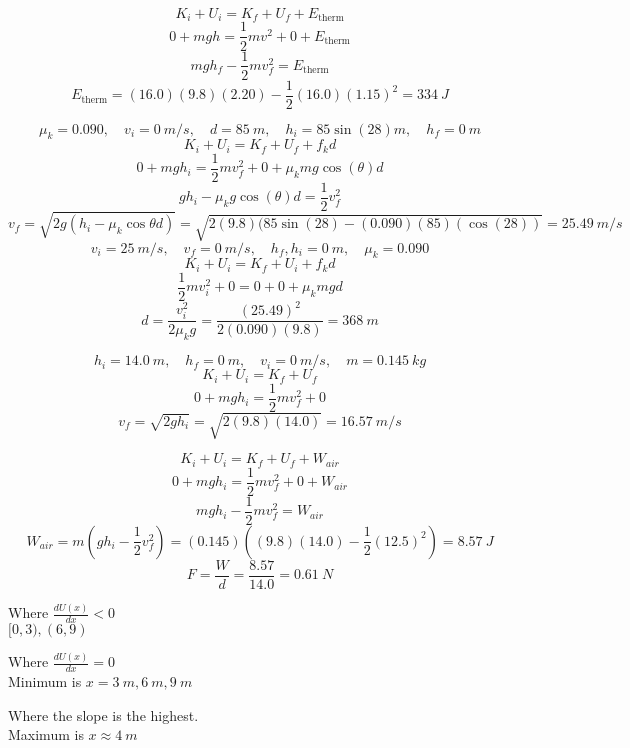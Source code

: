 \documentclass[11pt]{homework}
\begin{document}
\setcounter{questionCounter}{27}
\question
\[
K_i + U_i = K_f + U_f + E_{\text{therm}}
\]
\[
    0 +mgh = \frac{1}{2}mv^2 + 0 + E_{\text{therm}}
\]
\[
    mgh_f - \frac{1}{2}mv_f^2 = E_{\text{therm}}
\]
\[
    E_{\text{therm}}=(16.0)(9.8)(2.20)-\frac{1}{2}(16.0)(1.15)^2 = \boxed{\qty{334}{J}}
\]

\question
\begin{alphaparts}
\questionpart
\[
    \mu_k = 0.090, \quad v_i = \qty{0}{m/s}, \quad d = \qty{85}{m}, \quad h_i = 85\sin(28) \unit{m}, \quad h_f = \qty{0}{m}
\]
\[
K_i + U_i = K_f + U_f + f_kd 
\]
\[
    0 + mgh_i = \frac{1}{2}mv_f^2 + 0 + \mu_kmg\cos(\theta) d 
\]
\[
    gh_i - \mu_kg\cos(\theta)d = \frac{1}{2}v_f^2
\]
\[
    v_f=\sqrt{2g(h_i-\mu_k\cos\theta d)}=\sqrt{2(9.8)(85\sin(28)-(0.090)(85)(\cos(28))} = \boxed{\qty{25.49}{m/s}}
\]
\questionpart
\[
    v_i = \qty{25}{m/s}, \quad v_f = \qty{0}{m/s}, \quad h_f, h_i = \qty{0}{m}, \quad \mu_k = 0.090
\]
\[
K_i + U_i = K_f + U_i + f_kd
\]
\[
    \frac{1}{2}mv_i^2+0=0+0+\mu_kmgd
\]
\[
    d = \frac{v_i^2}{2\mu_kg}=\frac{(25.49)^2}{2(0.090)(9.8)}=\boxed{\qty{368}{m}}
\]
\end{alphaparts}

\question
\begin{alphaparts}
    \questionpart
    \[
    h_i = \qty{14.0}{m}, \quad h_f = \qty{0}{m}, \quad v_i = \qty{0}{m/s}, \quad m = \qty{0.145}{kg}
    \]
    \[
    K_i + U_i = K_f + U_f
    \]
    \[
        0 + mgh_i = \frac{1}{2}mv_f^2 + 0
    \]
    \[
        v_f = \sqrt{2gh_i}=\sqrt{2(9.8)(14.0)}=\boxed{\qty{16.57}{m/s}}
    \]
    
    
    
    \questionpart
    \[
        K_i + U_i = K_f + U_f + W_{air}
    \]
    \[
        0 + mgh_i = \frac{1}{2}mv_f^2 + 0 + W_{air}
    \]
    \[
        mgh_i - \frac{1}{2}mv_f^2 = W_{air}
    \]
    \[
        W_{air} = m(gh_i-\frac{1}{2}v_f^2)=(0.145)((9.8)(14.0)-\frac{1}{2}(12.5)^2) = \qty{8.57}{J}
    \]
    \[
        F = \frac{W}{d} = \frac{8.57}{14.0} = \boxed{\qty{0.61}{N}}
    \]
\end{alphaparts}

\setcounter{questionCounter}{72}
\question
\begin{alphaparts}
    \questionpart
    Where $\frac{dU(x)}{dx} < 0 $\\
    $[0,3), (6,9)$

    \questionpart
    Where $\frac{dU(x)}{dx} = 0$\\
    Minimum is $x=\qty{3}{m},\qty{6}{m},\qty{9}{m}$

    \questionpart
    Where the slope is the highest.\\
    Maximum is $x\approx \qty{4}{m}$

\end{alphaparts}
\end{document}
